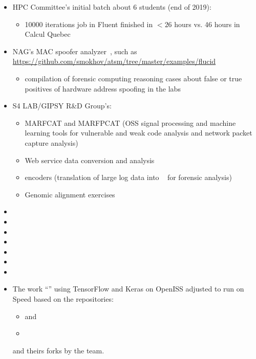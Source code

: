 \documentclass{easychair}
\begin{document}
\begin{itemize}
	\item 
HPC Committee's initial batch about 6 students (end of 2019):
\begin{itemize}
	\item 
10000 iterations job in Fluent finished in $<26$ hours vs. 46 hours in Calcul Quebec
\end{itemize}
	\item 
NAG's MAC spoofer analyzer~\cite{mac-spoofer-analyzer-intro-c3s2e2014,mac-spoofer-analyzer-detail-fps2014},
such as \url{https://github.com/smokhov/atsm/tree/master/examples/flucid}
\begin{itemize}
	\item 
compilation of forensic computing reasoning cases about false or true positives of hardware address spoofing in the labs
\end{itemize}
	\item 
S4 LAB/GIPSY R\&D Group's:
\begin{itemize}
	\item 
MARFCAT and MARFPCAT (OSS signal processing and machine learning tools for 
vulnerable and weak code analysis and network packet capture
analysis)~\cite{marfcat-nlp-ai2014,marfcat-sate2010-nist,fingerprinting-mal-traffic}
	\item 
Web service data conversion and analysis
	\item 
{\flucid} encoders (translation of large log data into {\flucid}~\cite{mokhov-phd-thesis-2013} for forensic analysis)
	\item 
Genomic alignment exercises
\end{itemize}
\item
{}
\item
{}
\item
{}
\item
{}
\item
{}
\item
{}
\item
{}

\item
The work ``'' using TensorFlow and Keras on OpenISS
adjusted to run on Speed based on the repositories:
\begin{itemize}
	\item 
{} and
	\item
{}
\end{itemize}
and theirs forks by the team.

\end{itemize}
\end{document}
